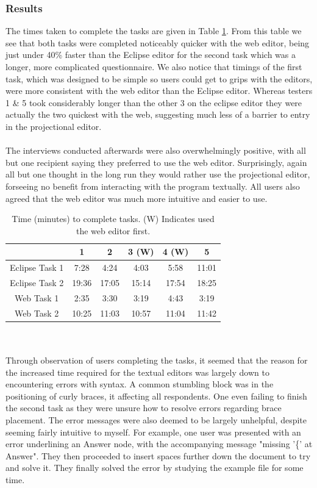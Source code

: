 \documentclass{article}
\begin{document}
\subsubsection{Results}
The times taken to complete the tasks are given in Table \ref{Tab:questionnaireResults}. From this table we see that both tasks were completed noticeably quicker with the web editor, being just under 40\% faster than the Eclipse editor for the second task which was a longer, more complicated questionnaire. We also notice that timings of the first task, which was designed to be simple so users could get to grips with the editors, were more consistent with the web editor than the Eclipse editor. Whereas testers 1 \& 5 took considerably longer than the other 3 on the eclipse editor they were actually the two quickest with the web, suggesting much less of a barrier to entry in the projectional editor.  
\\
\\
The interviews conducted afterwards were also overwhelmingly positive, with all but one recipient saying they preferred to use the web editor. Surprisingly, again all but one thought in the long run they would rather use the projectional editor, forseeing no benefit from interacting with the program textually. All users also agreed that the web editor was much more intuitive and easier to use.
\begin{table}[ht]
\centering
	\begin{tabular}{| c | c | c | c | c | c |}
	\hline
	& 1  & 2 & 3 (W) & 4 (W) & 5 \\
	\hline 
	Eclipse Task 1 & 7:28 & 4:24 & 4:03 & 5:58 & 11:01 \\
	Eclipse Task 2 & 19:36 & 17:05 & 15:14 & 17:54 & 18:25 \\
	Web Task 1 & 2:35 & 3:30 & 3:19 & 4:43 & 3:19 \\
	Web Task 2 & 10:25 & 11:03 & 10:57 & 11:04 & 11:42 \\
	\hline
	\end{tabular}
	\caption{Time (minutes) to complete tasks. (W) Indicates used the web editor first.}
	\label{Tab:questionnaireResults}
\end{table}
\\
\\
Through observation of users completing the tasks, it seemed that the reason for the increased time required for the textual editors was largely down to encountering errors with syntax. A common stumbling block was in the positioning of curly braces, it affecting all respondents. One even failing to finish the second task as they were unsure how to resolve errors regarding brace placement. The error messages were also deemed to be largely unhelpful, despite seeming fairly intuitive to myself. For example, one user was presented with an error underlining an Answer node, with the accompanying message "missing '\{' at Answer". They then proceeded to insert spaces further down the document to try and solve it. They finally solved the error by studying the example file for some time. 
\end{document}
